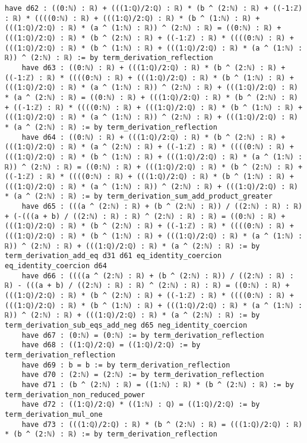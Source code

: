 \documentclass{article}
\begin{document}
\begin{tcolorbox}[colback=white!10, width=\linewidth]
\begin{lstlisting}[language=Lean4]
    have d62 : ((0:ℕ) : ℝ) + (((1:ℚ)/2:ℚ) : ℝ) * (b ^ (2:ℕ) : ℝ) + ((-1:ℤ) : ℝ) * ((((0:ℕ) : ℝ) + (((1:ℚ)/2:ℚ) : ℝ) * (b ^ (1:ℕ) : ℝ) + (((1:ℚ)/2:ℚ) : ℝ) * (a ^ (1:ℕ) : ℝ)) ^ (2:ℕ) : ℝ) = ((0:ℕ) : ℝ) + (((1:ℚ)/2:ℚ) : ℝ) * (b ^ (2:ℕ) : ℝ) + ((-1:ℤ) : ℝ) * ((((0:ℕ) : ℝ) + (((1:ℚ)/2:ℚ) : ℝ) * (b ^ (1:ℕ) : ℝ) + (((1:ℚ)/2:ℚ) : ℝ) * (a ^ (1:ℕ) : ℝ)) ^ (2:ℕ) : ℝ) := by term_derivation_reflection
    have d63 : ((0:ℕ) : ℝ) + (((1:ℚ)/2:ℚ) : ℝ) * (b ^ (2:ℕ) : ℝ) + ((-1:ℤ) : ℝ) * ((((0:ℕ) : ℝ) + (((1:ℚ)/2:ℚ) : ℝ) * (b ^ (1:ℕ) : ℝ) + (((1:ℚ)/2:ℚ) : ℝ) * (a ^ (1:ℕ) : ℝ)) ^ (2:ℕ) : ℝ) + (((1:ℚ)/2:ℚ) : ℝ) * (a ^ (2:ℕ) : ℝ) = ((0:ℕ) : ℝ) + (((1:ℚ)/2:ℚ) : ℝ) * (b ^ (2:ℕ) : ℝ) + ((-1:ℤ) : ℝ) * ((((0:ℕ) : ℝ) + (((1:ℚ)/2:ℚ) : ℝ) * (b ^ (1:ℕ) : ℝ) + (((1:ℚ)/2:ℚ) : ℝ) * (a ^ (1:ℕ) : ℝ)) ^ (2:ℕ) : ℝ) + (((1:ℚ)/2:ℚ) : ℝ) * (a ^ (2:ℕ) : ℝ) := by term_derivation_reflection
    have d64 : ((0:ℕ) : ℝ) + (((1:ℚ)/2:ℚ) : ℝ) * (b ^ (2:ℕ) : ℝ) + (((1:ℚ)/2:ℚ) : ℝ) * (a ^ (2:ℕ) : ℝ) + ((-1:ℤ) : ℝ) * ((((0:ℕ) : ℝ) + (((1:ℚ)/2:ℚ) : ℝ) * (b ^ (1:ℕ) : ℝ) + (((1:ℚ)/2:ℚ) : ℝ) * (a ^ (1:ℕ) : ℝ)) ^ (2:ℕ) : ℝ) = ((0:ℕ) : ℝ) + (((1:ℚ)/2:ℚ) : ℝ) * (b ^ (2:ℕ) : ℝ) + ((-1:ℤ) : ℝ) * ((((0:ℕ) : ℝ) + (((1:ℚ)/2:ℚ) : ℝ) * (b ^ (1:ℕ) : ℝ) + (((1:ℚ)/2:ℚ) : ℝ) * (a ^ (1:ℕ) : ℝ)) ^ (2:ℕ) : ℝ) + (((1:ℚ)/2:ℚ) : ℝ) * (a ^ (2:ℕ) : ℝ) := by term_derivation_sum_add_product_greater
    have d65 : (((a ^ (2:ℕ) : ℝ) + (b ^ (2:ℕ) : ℝ)) / ((2:ℕ) : ℝ) : ℝ) + (-(((a + b) / ((2:ℕ) : ℝ) : ℝ) ^ (2:ℕ) : ℝ) : ℝ) = ((0:ℕ) : ℝ) + (((1:ℚ)/2:ℚ) : ℝ) * (b ^ (2:ℕ) : ℝ) + ((-1:ℤ) : ℝ) * ((((0:ℕ) : ℝ) + (((1:ℚ)/2:ℚ) : ℝ) * (b ^ (1:ℕ) : ℝ) + (((1:ℚ)/2:ℚ) : ℝ) * (a ^ (1:ℕ) : ℝ)) ^ (2:ℕ) : ℝ) + (((1:ℚ)/2:ℚ) : ℝ) * (a ^ (2:ℕ) : ℝ) := by term_derivation_add_eq d31 d61 eq_identity_coercion eq_identity_coercion d64
    have d66 : ((((a ^ (2:ℕ) : ℝ) + (b ^ (2:ℕ) : ℝ)) / ((2:ℕ) : ℝ) : ℝ) - (((a + b) / ((2:ℕ) : ℝ) : ℝ) ^ (2:ℕ) : ℝ) : ℝ) = ((0:ℕ) : ℝ) + (((1:ℚ)/2:ℚ) : ℝ) * (b ^ (2:ℕ) : ℝ) + ((-1:ℤ) : ℝ) * ((((0:ℕ) : ℝ) + (((1:ℚ)/2:ℚ) : ℝ) * (b ^ (1:ℕ) : ℝ) + (((1:ℚ)/2:ℚ) : ℝ) * (a ^ (1:ℕ) : ℝ)) ^ (2:ℕ) : ℝ) + (((1:ℚ)/2:ℚ) : ℝ) * (a ^ (2:ℕ) : ℝ) := by term_derivation_sub_eqs_add_neg d65 neg_identity_coercion
    have d67 : (0:ℕ) = (0:ℕ) := by term_derivation_reflection
    have d68 : ((1:ℚ)/2:ℚ) = ((1:ℚ)/2:ℚ) := by term_derivation_reflection
    have d69 : b = b := by term_derivation_reflection
    have d70 : (2:ℕ) = (2:ℕ) := by term_derivation_reflection
    have d71 : (b ^ (2:ℕ) : ℝ) = ((1:ℕ) : ℝ) * (b ^ (2:ℕ) : ℝ) := by term_derivation_non_reduced_power
    have d72 : ((1:ℚ)/2:ℚ) * ((1:ℕ) : ℚ) = ((1:ℚ)/2:ℚ) := by term_derivation_mul_one
    have d73 : (((1:ℚ)/2:ℚ) : ℝ) * (b ^ (2:ℕ) : ℝ) = (((1:ℚ)/2:ℚ) : ℝ) * (b ^ (2:ℕ) : ℝ) := by term_derivation_reflection

\end{lstlisting}
\end{tcolorbox}
\end{document}
